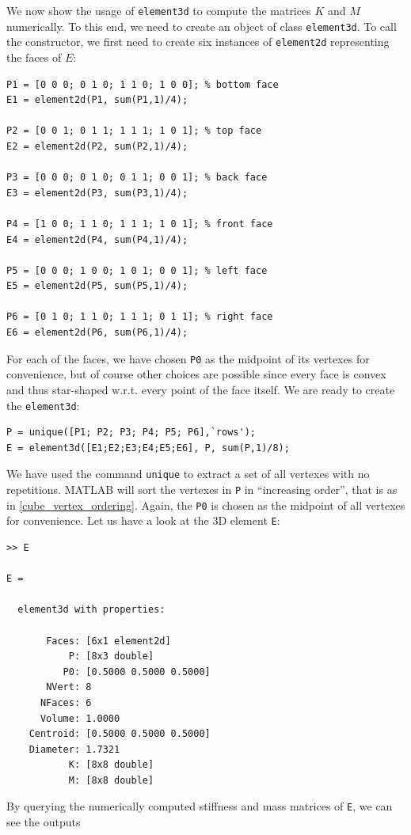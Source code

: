 \documentclass[a4paper]{article}
\begin{document}
\noindent
We now show the usage of \texttt{element3d} to compute the matrices $K$ and $M$ numerically. To this end, we need to create an object of class \texttt{element3d}. To call the constructor, we first need to create six instances of \texttt{element2d} representing the faces of $E$:

\begin{lstlisting}
P1 = [0 0 0; 0 1 0; 1 1 0; 1 0 0]; % bottom face
E1 = element2d(P1, sum(P1,1)/4);

P2 = [0 0 1; 0 1 1; 1 1 1; 1 0 1]; % top face
E2 = element2d(P2, sum(P2,1)/4);

P3 = [0 0 0; 0 1 0; 0 1 1; 0 0 1]; % back face
E3 = element2d(P3, sum(P3,1)/4);

P4 = [1 0 0; 1 1 0; 1 1 1; 1 0 1]; % front face
E4 = element2d(P4, sum(P4,1)/4);

P5 = [0 0 0; 1 0 0; 1 0 1; 0 0 1]; % left face
E5 = element2d(P5, sum(P5,1)/4);

P6 = [0 1 0; 1 1 0; 1 1 1; 0 1 1]; % right face
E6 = element2d(P6, sum(P6,1)/4);
\end{lstlisting}

\noindent
For each of the faces,  we have chosen \texttt{P0} as the midpoint of its vertexes for convenience, but of course other choices are possible since every face is convex and thus star-shaped w.r.t. every point of the face itself.  We are ready to create the \texttt{element3d}:
\begin{lstlisting}
P = unique([P1; P2; P3; P4; P5; P6],`rows');
E = element3d([E1;E2;E3;E4;E5;E6], P, sum(P,1)/8);
\end{lstlisting}
We have used the command \texttt{unique} to extract a set of all vertexes with no repetitions. MATLAB will sort the vertexes in \texttt{P} in ``increasing order'', that is as in \eqref{cube_vertex_ordering}.  Again, the \texttt{P0} is chosen as the midpoint of all vertexes for convenience. Let us have a look at the 3D element \texttt{E}:
\begin{lstlisting}
>> E

E = 

  element3d with properties:

       Faces: [6x1 element2d]
           P: [8x3 double]
          P0: [0.5000 0.5000 0.5000]
       NVert: 8
      NFaces: 6
      Volume: 1.0000
    Centroid: [0.5000 0.5000 0.5000]
    Diameter: 1.7321
           K: [8x8 double]
           M: [8x8 double]
\end{lstlisting}

\noindent
By querying the numerically computed  stiffness and mass matrices of \texttt{E}, we can see the outputs
\end{document}
